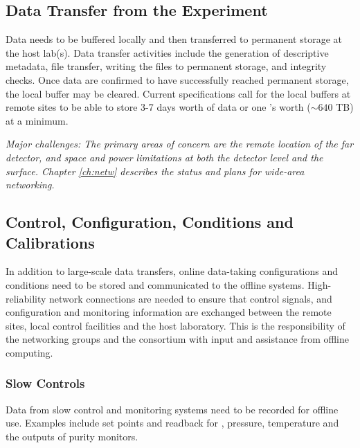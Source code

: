 \documentclass[../main-v1.tex]{subfiles}
\begin{document}
\subsection{Data Transfer from the Experiment}
Data needs to be buffered locally and then transferred to permanent storage at the host lab(s).  Data transfer activities include the generation of descriptive metadata, file transfer, writing the files to permanent storage, and integrity checks.  Once data are confirmed to have successfully reached permanent storage, the local buffer may be cleared.  Current specifications call for the local buffers at remote sites to be able to store 3-7 days worth of data or one 's worth ($\sim 640$ TB) at a minimum. 

{\it Major challenges: %
The %
primary areas of concern are the remote location of the far detector, and space and power limitations at both the  detector level and the surface. Chapter \ref{ch:netw} describes the status and plans for wide-area networking.} %

\subsection{Control, Configuration, Conditions and Calibrations}
In addition to large-scale data transfers, online data-taking configurations and conditions need to be stored and communicated to the offline systems. High-reliability network connections are needed to ensure that control signals, and configuration and monitoring information are exchanged between the remote sites, local control facilities and the host laboratory.
This is the responsibility of the  networking groups and the  consortium with input and assistance from offline computing. 


\subsubsection{Slow Controls}
Data from slow control and monitoring systems need to be recorded for offline use.  Examples include set points and readback for , %
pressure, temperature and the outputs of purity monitors. 
\end{document}
